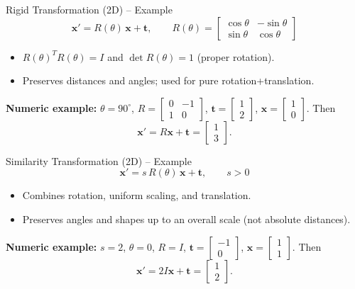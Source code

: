 \documentclass[aspectratio=169,10pt]{beamer}
\begin{document}
\begin{frame}{Rigid Transformation (2D) -- Example}
\small
\[
\mathbf{x}' = R(\theta)\,\mathbf{x} + \mathbf{t}, \qquad
R(\theta) = \begin{bmatrix}\cos\theta & -\sin\theta \\\sin\theta & \cos\theta\end{bmatrix}
\]
\vspace{0.4em}
\begin{itemize}
  \item $R(\theta)^T R(\theta) = I$ and $\det R(\theta)=1$ (proper rotation).
  \item Preserves distances and angles; used for pure rotation+translation.
\end{itemize}
\vspace{0.4em}
\textbf{Numeric example: } $\theta=90^\circ$, $R=\begin{bmatrix}0&-1\\1&0\end{bmatrix}$, $\mathbf{t}=\begin{bmatrix}1\\2\end{bmatrix}$, $\mathbf{x}=\begin{bmatrix}1\\0\end{bmatrix}$. Then
\[
\mathbf{x}'=R\mathbf{x}+\mathbf{t}=\begin{bmatrix}1\\3\end{bmatrix}.
\]
\end{frame}

\begin{frame}{Similarity Transformation (2D) -- Example}
\small
\[
\mathbf{x}' = s\,R(\theta)\,\mathbf{x} + \mathbf{t},\qquad s>0
\]
\vspace{0.4em}
\begin{itemize}
  \item Combines rotation, uniform scaling, and translation.
  \item Preserves angles and shapes up to an overall scale (not absolute distances).
\end{itemize}
\vspace{0.4em}
\textbf{Numeric example: } $s=2$, $\theta=0$, $R=I$, $\mathbf{t}=\begin{bmatrix}-1\\0\end{bmatrix}$, $\mathbf{x}=\begin{bmatrix}1\\1\end{bmatrix}$. Then
\[
\mathbf{x}'=2I\mathbf{x}+\mathbf{t}=\begin{bmatrix}1\\2\end{bmatrix}.
\]
\end{frame}
\end{document}

